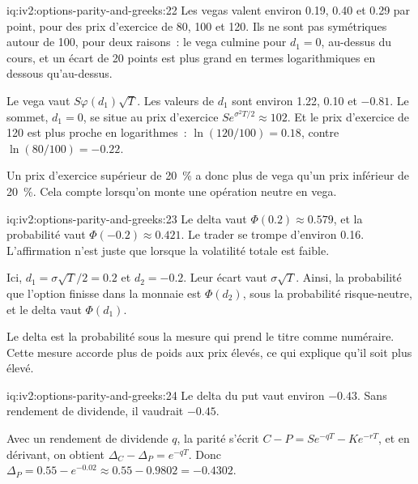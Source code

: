\begin{solution}{iq:iv2:options-parity-and-greeks:22}
Les vegas valent environ 0.19, 0.40 et 0.29 par point, pour des prix d'exercice de 80, 100 et 120. Ils ne sont pas symétriques autour de 100, pour deux raisons~: le vega culmine pour $d_1 = 0$, au-dessus du cours, et un écart de 20 points est plus grand en termes logarithmiques en dessous qu'au-dessus.

Le vega vaut $S\varphi(d_1)\sqrt T$. Les valeurs de $d_1$ sont environ 1.22, 0.10 et $-0.81$. Le sommet, $d_1 = 0$, se situe au prix d'exercice $Se^{\sigma^2T/2} \approx 102$. Et le prix d'exercice de 120 est plus proche en logarithmes~: $\ln(120/100) = 0.18$, contre $\ln(80/100) = -0.22$.

Un prix d'exercice supérieur de 20~\% a donc plus de vega qu'un prix inférieur de 20~\%. Cela compte lorsqu'on monte une opération neutre en vega.

\end{solution}

\begin{solution}{iq:iv2:options-parity-and-greeks:23}
Le delta vaut $\Phi(0.2) \approx 0.579$, et la probabilité vaut $\Phi(-0.2) \approx 0.421$. Le trader se trompe d'environ 0.16. L'affirmation n'est juste que lorsque la volatilité totale est faible.

Ici, $d_1 = \sigma\sqrt T/2 = 0.2$ et $d_2 = -0.2$. Leur écart vaut $\sigma\sqrt T$. Ainsi, la probabilité que l'option finisse dans la monnaie est $\Phi(d_2)$, sous la probabilité risque-neutre, et le delta vaut $\Phi(d_1)$.

Le delta est la probabilité sous la mesure qui prend le titre comme numéraire. Cette mesure accorde plus de poids aux prix élevés, ce qui explique qu'il soit plus élevé.

\end{solution}

\begin{solution}{iq:iv2:options-parity-and-greeks:24}
Le delta du put vaut environ $-0.43$. Sans rendement de dividende, il vaudrait $-0.45$.

Avec un rendement de dividende $q$, la parité s'écrit $C - P = Se^{-qT} - Ke^{-rT}$, et en dérivant, on obtient $\Delta_C - \Delta_P = e^{-qT}$. Donc $\Delta_P = 0.55 - e^{-0.02} \approx 0.55 - 0.9802 = -0.4302$.

\end{solution}

